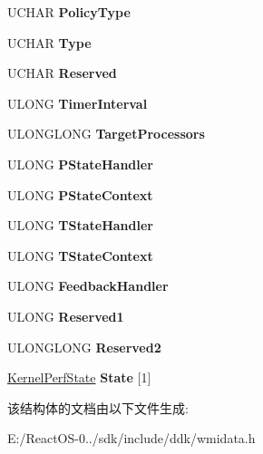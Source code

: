 \begin{DoxyCompactItemize}
U\+C\+H\+AR {\bfseries Policy\+Type}
\item 
\mbox{\label{struct___kernel_perf_states_a820d82c174991cce214272c34777c72a}} 
U\+C\+H\+AR {\bfseries Type}
\item 
\mbox{\label{struct___kernel_perf_states_a7f8cf461b60b4a2119183a4e718cd7dc}} 
U\+C\+H\+AR {\bfseries Reserved}
\item 
\mbox{\label{struct___kernel_perf_states_a6588c3d4a67eef8b9189e9641a06e846}} 
U\+L\+O\+NG {\bfseries Timer\+Interval}
\item 
\mbox{\label{struct___kernel_perf_states_adb3a2cd3d4e92f7681e7338da9b9192c}} 
U\+L\+O\+N\+G\+L\+O\+NG {\bfseries Target\+Processors}
\item 
\mbox{\label{struct___kernel_perf_states_a484f1a57e6da27c5cd22f6fe873e35aa}} 
U\+L\+O\+NG {\bfseries P\+State\+Handler}
\item 
\mbox{\label{struct___kernel_perf_states_aa082fe7b8ec79a9ff5bada98a0d83bf6}} 
U\+L\+O\+NG {\bfseries P\+State\+Context}
\item 
\mbox{\label{struct___kernel_perf_states_ac03d6e8eb2da6edd41c4b1af0b16dd51}} 
U\+L\+O\+NG {\bfseries T\+State\+Handler}
\item 
\mbox{\label{struct___kernel_perf_states_a0ccb337aa924c59ff04d01f0b026a2ad}} 
U\+L\+O\+NG {\bfseries T\+State\+Context}
\item 
\mbox{\label{struct___kernel_perf_states_ae9774ff4b0c324f8f622256286ac5036}} 
U\+L\+O\+NG {\bfseries Feedback\+Handler}
\item 
\mbox{\label{struct___kernel_perf_states_ad42deda8c10e044e3fbd5c0d1f89418a}} 
U\+L\+O\+NG {\bfseries Reserved1}
\item 
\mbox{\label{struct___kernel_perf_states_ac2ac870fa0c4b9f4262defd8c77aac40}} 
U\+L\+O\+N\+G\+L\+O\+NG {\bfseries Reserved2}
\item 
\mbox{\label{struct___kernel_perf_states_ac8f655be9537a01e810727c17ebedc8b}} 
\hyperlink{struct___kernel_perf_state}{Kernel\+Perf\+State} {\bfseries State} \mbox{[}1\mbox{]}
\end{DoxyCompactItemize}


该结构体的文档由以下文件生成\+:\begin{DoxyCompactItemize}
\item 
E\+:/\+React\+O\+S-\/0../sdk/include/ddk/wmidata.\+h\end{DoxyCompactItemize}
